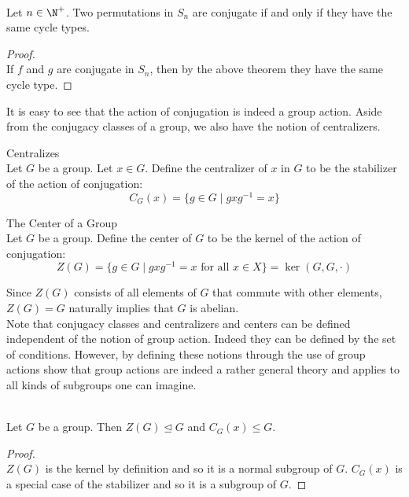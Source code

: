 \documentclass[a4paper]{article}
\begin{document}
\begin{eg}{}{}\\
Let $n\in\N^+$. Two permutations in $S_n$ are conjugate if and only if they have the same cycle types. 
\begin{proof}\\
If $f$ and $g$ are conjugate in $S_n$, then by the above theorem they have the same cycle type. 
\end{proof}
\end{eg}

It is easy to see that the action of conjugation is indeed a group action. Aside from the conjugacy classes of a group, we also have the notion of centralizers. 

\begin{defn}{Centralizes}{}\\
Let $G$ be a group. Let $x\in G$. Define the centralizer of $x$ in $G$ to be the stabilizer of the action of conjugation: $$C_G(x)=\{g\in G\;|\;gxg^{-1}=x\}$$
\end{defn}

\begin{defn}{The Center of a Group}{}\\
Let $G$ be a group. Define the center of $G$ to be the kernel of the action of conjugation: $$Z(G)=\{g\in G\;|\;gxg^{-1}=x\text{ for all }x\in X\}=\ker(G,G,\cdot)$$
\end{defn}

Since $Z(G)$ consists of all elements of $G$ that commute with other elements,  $Z(G)=G$ naturally implies that $G$ is abelian. \\

Note that conjugacy classes and centralizers and centers can be defined independent of the notion of group action. Indeed they can be defined by the set of conditions. However, by defining these notions through the use of group actions show that group actions are indeed a rather general theory and applies to all kinds of subgroups one can imagine. 

\begin{lmm}{}{}\\
Let $G$ be a group. Then $Z(G)\trianglelefteq G$ and $C_G(x)\leq G$. 
\begin{proof}\\
$Z(G)$ is the kernel by definition and so it is a normal subgroup of $G$. $C_G(x)$ is a special case of the stabilizer and so it is a subgroup of $G$. 
\end{proof}
\end{lmm}
\end{document}

